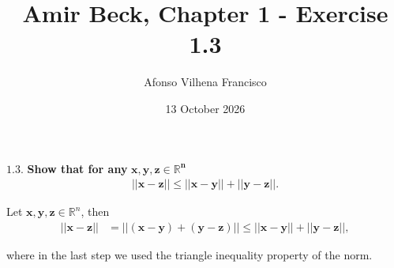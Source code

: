 \documentclass{article}
\title{Amir Beck, Chapter 1 - Exercise 1.3}
\author{Afonso Vilhena Francisco}
\date{13 October 2026}
\begin{document}
\maketitle

$\mathbf{1.3.}$ \textbf{Show that for any} $\mathbf{x,y,z \in \mathbb{R}^n}$
\begin{align*}
    \mathbf{||x-z|| \leq ||x-y||+||y-z||.}
\end{align*}

\vspace{0.3cm}

Let $\mathbf{x,y,z} \in \mathbb{R}^n$, then
\begin{align*}
    ||\mathbf{x-z||} &= ||\mathbf{(x-y)+(y-z)}|| \leq ||\mathbf{x-y}||+||\mathbf{y-z}||,
\end{align*}

where in the last step we used the triangle inequality property of the norm.
\end{document}

